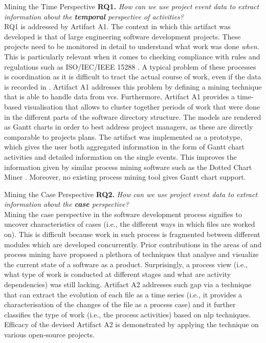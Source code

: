 \begin{question}{Mining the Time Perspective}
\textbf{RQ1.} \emph{How can we use project event data to extract information about the \textbf{temporal} perspective of activities?}\\


RQ1 is addressed by Artifact A1. The context in which this artifact was developed is that of large engineering software development projects. These projects need to be monitored in detail to understand what work was done \emph{when}. This is particularly relevant when it comes to checking compliance with rules and regulations such as ISO/IEC/IEEE 15288 \citep{international2015iso}. A typical problem of these processes is coordination as it is difficult to tract the actual course of work, even if the data is recorded in . Artifact A1 addresses this problem by defining a mining technique that is able to handle data from \gls{vcs}. Furthermore, Artifact A1 provides a time-based visualisation that allows to cluster together periods of work that were done in the different parts of the software directory structure. The models are rendered as Gantt charts in order to best address project managers, as these are directly comparable to projects plans. The artifact was implemented as a prototype, which gives the user both aggregated information in the form of Gantt chart activities and detailed information on the single events. This improves the information given by similar process mining software such as the Dotted Chart Miner \citep{Song2007}. Moreover, no existing process mining tool gives Gantt chart support.
\end{question}



\begin{question}{Mining the Case Perspective}
	\textbf{RQ2.} \emph{How can we use project event data to extract information about the \textbf{case} perspective?}\\
	
	
	Mining the case perspective in the software development process signifies to uncover characteristics of cases (i.e., the different ways in which files are worked on). This is difficult because work in such process is fragmented between different modules which are developed concurrently. Prior contributions in the areas of  and process mining have proposed a plethora of techniques that analyse and visualize the current state of a software as a product. Surprisingly, a process view (i.e., what type of work is conducted at different stages and what are activity dependencies) was still lacking. Artifact A2 addresses such gap via a technique that can extract the evolution of each file as a time series (i.e., it provides a characterisation of the changes of the file as a process case) and it further classifies the type of work (i.e., the process activities) based on \gls{nlp} techniques. Efficacy of the devised Artifact A2 is demonstrated by applying the technique on various open-source projects. 
\end{question}





